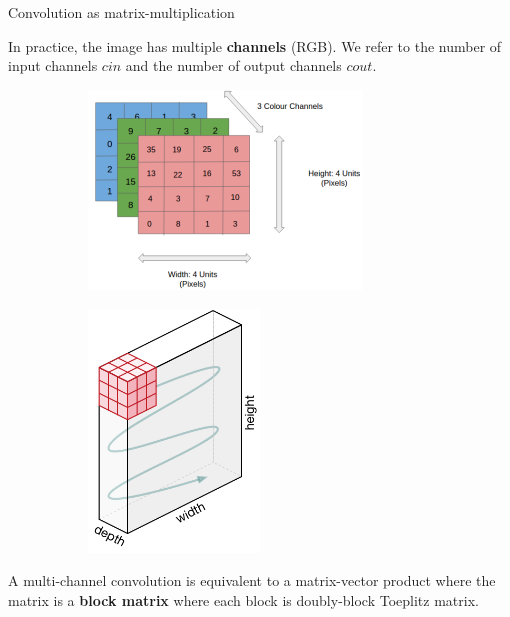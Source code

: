 \begin{frame}{Convolution as matrix-multiplication}


  In practice, the image has multiple \textbf{channels} (\eg RGB). We refer to the number of input channels $cin$ and the number of output channels $cout$.

  \begin{figure}
    \begin{subfigure}[t]{0.49\textwidth}
      \centering
      \includegraphics[width=0.8\textwidth]{images/image_rgb.png}
      \caption*{}
    \end{subfigure}
    \begin{subfigure}[t]{0.45\textwidth}
      \centering
      \includegraphics[width=0.5\textwidth]{images/conv_2d.png}
      \caption*{}
    \end{subfigure}
  \end{figure}

  A multi-channel convolution is equivalent to a matrix-vector product where the matrix is a \textbf{block matrix} where each block is doubly-block Toeplitz matrix. 

\end{frame}



